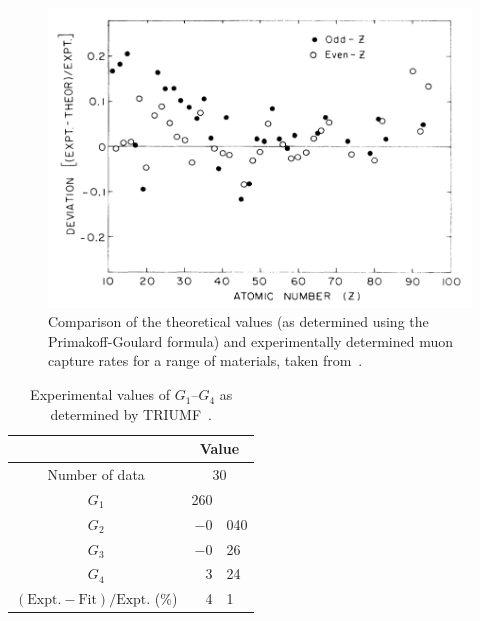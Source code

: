 \begin{figure}[hptb]
  \centering
    \includegraphics[width=.9\textwidth]{images/primakoff-goulard_vs_exp.png}
  \caption{Comparison of the theoretical values (as determined using the Primakoff-Goulard formula) and experimentally determined muon capture rates for a range of materials, taken from~\cite{suzuki_mu_capture_rates}.}
  \label{fig:primakoff-goulard_vs_exp}
\end{figure}

\begin{table}
  \begin{center}
  \begin{tabular}{c | r@{.}l }
                                                              & \multicolumn{2}{c}{Value} \\
    \hline
    Number of data                                            & \multicolumn{2}{c}{30}                 \\
    \hline
    \( G_1 \)                                                 &             260 &                       \\
    \( G_2 \)                                                 &          \(-0\) & 040                   \\
    \( G_3 \)                                                 &          \(-0\) & 26                    \\
    \( G_4 \)                                                 &               3 & 24                    \\
    \hline
    \( (\textrm{Expt.} - \textrm{Fit})/\textrm{Expt.} \) (\%) &               4 & 1                     \\
  \end{tabular}
  \end{center}
  \caption{Experimental values of \( G_1 \)--\( G_4 \) as determined by TRIUMF~\cite{suzuki_mu_capture_rates}.}
  \label{tab:g1_to_g4}
\end{table}


